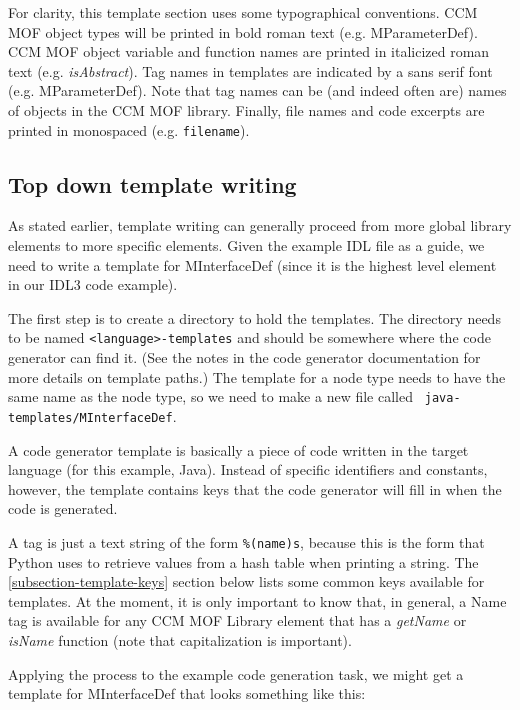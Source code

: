 For clarity, this template section uses some typographical conventions. CCM MOF
object types will be printed in bold roman text (e.g. MParameterDef). CCM
MOF object variable and function names are printed in italicized roman text
(e.g. {\it isAbstract\/}). Tag names in templates are indicated by a sans serif
font (e.g. {\sf MParameterDef}). Note that tag names can be (and indeed often
are) names of objects in the CCM MOF library. Finally, file names and code
excerpts are printed in monospaced (e.g. {\tt filename}).

\subsection{Top down template writing}

As stated earlier, template writing can generally proceed from more global
library elements to more specific elements. Given the example IDL file as a
guide, we need to write a template for MInterfaceDef (since it is the highest
level element in our IDL3 code example).

The first step is to create a directory to hold the templates. The directory
needs to be named {\tt <language>-templates} and should be somewhere where the
code generator can find it. (See the notes in the code generator documentation
for more details on template paths.) The template for a node type needs to have
the same name as the node type, so we need to make a new file called {\tt
java-templates/MInterfaceDef}.

A code generator template is basically a piece of code written in the target
language (for this example, Java). Instead of specific identifiers and
constants, however, the template contains keys that the code generator will fill
in when the code is generated.

A tag is just a text string of the form {\tt \%(name)s}, because this is the
form that Python uses to retrieve values from a hash table when printing a
string. The \ref{subsection-template-keys} section below lists some common keys
available for templates. At the moment, it is only important to know that, in
general, a {\sf Name} tag is available for any CCM MOF Library element that has
a {\it getName\/} or {\it isName\/} function (note that capitalization is
important).

Applying the process to the example code generation task, we might get a
template for MInterfaceDef that looks something like this:

